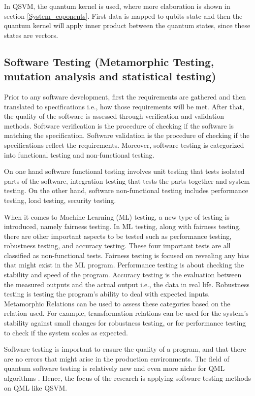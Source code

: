 \documentclass[12pt,a4paper]{article}
\begin{document}
	In QSVM, the quantum kernel is used, where more elaboration is shown in section \ref{System_coponents}. First data is mapped to qubits state and then the quantum kernel will apply inner product between the quantum states, since these states are vectors.
	
	\subsection{Software Testing (Metamorphic Testing, mutation analysis and statistical testing)}
	
	Prior to any software development, first the requirements are gathered and then translated to specifications i.e., how those requirements will be met. After that, the quality of the software is assessed through verification and validation methods. Software verification is the procedure of checking if the software is matching the specification. Software validation is the procedure of checking if the specifications reflect the requirements. Moreover, software testing is categorized into functional testing and non-functional testing.
	
	On one hand software functional testing involves unit testing that tests isolated parts of the software, integration testing that tests the parts together and system testing. On the other hand, software non-functional testing includes performance testing, load testing, security testing.
	
	When it comes to Machine Learning (ML) testing, a new type of testing is introduced, namely fairness testing. In ML testing, along with fairness testing, there are other important aspects to be tested such as performance testing, robustness testing, and accuracy testing. These four important tests are all classified as non-functional tests. Fairness testing is focused on revealing any bias that might exist in the ML program. Performance testing is about checking the stability and speed of the program. Accuracy testing is the evaluation between the measured outputs and the actual output i.e., the data in real life. Robustness testing is testing the program's ability to deal with expected inputs. Metamorphic Relations can be used to assess these categories based on the relation used. For example, transformation relations can be used for the system's stability against small changes for robustness testing, or for performance testing to check if the system scales as expected.
	
	Software testing is important to ensure the quality of a program, and that there are no errors that might arise in the production environments. The field of quantum software testing is relatively new \cite{paltenghi2024surveytestinganalysisquantum} \cite{10.1145/3712002} and even more niche for QML algorithms \cite{zaman2025surveyquantummachinelearning} \cite{2021APS..MARS32013L}. Hence, the focus of the research is applying software testing methods on QML like QSVM. 
	
\end{document}
